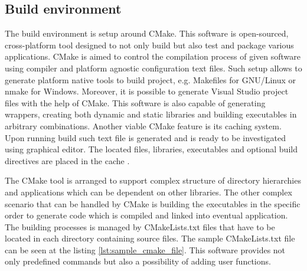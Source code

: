 \subsection{Build environment}

The build environment is setup around CMake. This software is open-sourced, cross-platform tool
designed to not only build but also test and package various applications. CMake is aimed to
control the compilation process of given software using compiler and platform agnostic configuration
text files. Such setup allows to generate platform native tools to build project, e.g. Makefiles
for GNU/Linux or nmake for Windows. Moreover, it is possible to generate Visual Studio project
files with the help of CMake. This software is also capable of generating wrappers, creating
both dynamic and static libraries and building executables in arbitrary combinations. Another
viable CMake feature is its caching system. Upon running build such text file is generated
and is ready to be investigated using graphical editor. The located files, libraries, executables
and optional build directives are placed in the cache \cite{cmake}.

The CMake tool is arranged to support complex structure of directory hierarchies and applications
which can be dependent on other libraries. The other complex scenario that can be handled by CMake
is building the executables in the specific order to generate code which is compiled and linked
into eventual application. The building processes is managed by CMakeLists.txt files that have
to be located in each directory containing source files. The sample CMakeLists.txt file can be
seen at the listing \ref{lst:sample_cmake_file}. This software provides not only predefined commands
but also a possibility of adding user functions.

